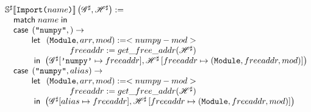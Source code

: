 \begin{enumerate}
\[\arraycolsep=1.4pt
  \begin{array}[t]{l}
    \Ctx{S^\sharp}{\SLit{Import}{name}}\left(\Glo^\sharp, \Hea^\sharp\right) := \\
    \quad \matchm{name} \\
    \quad \casem{\left(\texttt{"numpy"},\right)} \to \\
    \quad\qquad\begin{array}[t]{rl}
            \letm&
              \begin{array}[t]{rl}
                 (\texttt{Module}, arr, mod) := <numpy-mod> \\
                 freeaddr := get\_free\_addr(\Hea^\sharp) \\
              \end{array} \\
             \inm& \left( \Glo^\sharp[\texttt{'numpy'} \mapsto freeaddr],
                      \Hea^\sharp\left[freeaddr \mapsto (\texttt{Module}, freeaddr, mod)\right]
                   \right) \\
    \end{array} \\
    \quad \casem{\left(\texttt{"numpy"}, alias\right)} \to \\
    \quad\qquad\begin{array}[t]{rl}
            \letm&
              \begin{array}[t]{rl}
                 (\texttt{Module}, arr, mod) := <numpy-mod> \\
                 freeaddr := get\_free\_addr(\Hea^\sharp) \\
              \end{array} \\
             \inm& \left( \Glo^\sharp[alias \mapsto freeaddr],
                      \Hea^\sharp\left[freeaddr \mapsto (\texttt{Module}, freeaddr, mod)\right]
                   \right) \\
    \end{array} \\
  \end{array}\]

%
\end{enumerate}


